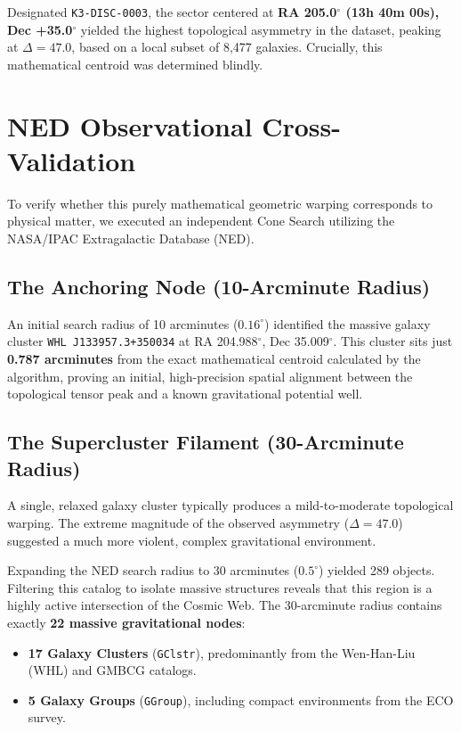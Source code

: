 \documentclass[aps,prd,twocolumn,nofootinbib,superscriptaddress,10pt]{revtex4-2}
\begin{document}
Designated \texttt{K3-DISC-0003}, the sector centered at \textbf{RA 205.0$^\circ$ (13h 40m 00s), Dec +35.0$^\circ$} yielded the highest topological asymmetry in the dataset, peaking at $\Delta = 47.0$, based on a local subset of 8,477 galaxies. Crucially, this mathematical centroid was determined blindly.

\section{NED Observational Cross-Validation}

To verify whether this purely mathematical geometric warping corresponds to physical matter, we executed an independent Cone Search utilizing the NASA/IPAC Extragalactic Database (NED).

\subsection{The Anchoring Node (10-Arcminute Radius)}
An initial search radius of 10 arcminutes ($0.16^\circ$) identified the massive galaxy cluster \texttt{WHL J133957.3+350034} at RA 204.988$^\circ$, Dec 35.009$^\circ$. This cluster sits just \textbf{0.787 arcminutes} from the exact mathematical centroid calculated by the algorithm, proving an initial, high-precision spatial alignment between the topological tensor peak and a known gravitational potential well.

\subsection{The Supercluster Filament (30-Arcminute Radius)}
A single, relaxed galaxy cluster typically produces a mild-to-moderate topological warping. The extreme magnitude of the observed asymmetry ($\Delta = 47.0$) suggested a much more violent, complex gravitational environment. 

Expanding the NED search radius to 30 arcminutes ($0.5^\circ$) yielded 289 objects. Filtering this catalog to isolate massive structures reveals that this region is a highly active intersection of the Cosmic Web. The 30-arcminute radius contains exactly \textbf{22 massive gravitational nodes}:
\begin{itemize}
    \item \textbf{17 Galaxy Clusters} (\texttt{GClstr}), predominantly from the Wen-Han-Liu (WHL) \cite{Wen2012} and GMBCG \cite{Hao2010} catalogs.
    \item \textbf{5 Galaxy Groups} (\texttt{GGroup}), including compact environments from the ECO survey.
\end{itemize}
\end{document}
